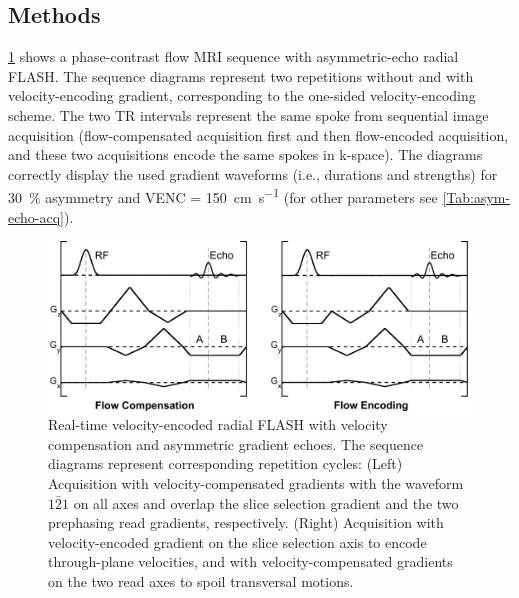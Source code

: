 \subsection{Methods}
\cref{Fig:aysm-echo-seq-pc} shows a phase-contrast flow MRI sequence with asymmetric-echo radial FLASH. The sequence diagrams represent two repetitions without and with velocity-encoding gradient, corresponding to the one-sided velocity-encoding scheme. The two TR intervals represent the same spoke from sequential image acquisition (flow-compensated acquisition first and then flow-encoded acquisition, and these two acquisitions encode the same spokes in k-space). The diagrams correctly display the used gradient waveforms (i.e., durations and strengths) for \SI{30}{\percent} asymmetry and VENC = \SI{150}{\cm\per\second} (for other parameters see \cref{Tab:asym-echo-acq}).
\begin{figure}[tb]
  \centering
  \includegraphics[width=\textwidth]{fig/asym-echo-seq-pc.png}
  \caption{Real-time velocity-encoded radial FLASH with velocity compensation and asymmetric gradient echoes. The sequence diagrams represent corresponding repetition cycles: (Left) Acquisition with velocity-compensated gradients with the waveform $1 \bar{2} 1$ on all axes and overlap the slice selection gradient and the two prephasing read gradients, respectively. (Right) Acquisition with velocity-encoded gradient on the slice selection axis to encode through-plane velocities, and with velocity-compensated gradients on the two read axes to spoil transversal motions.} \label{Fig:aysm-echo-seq-pc}
\end{figure}

